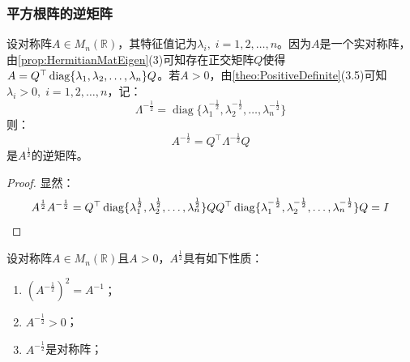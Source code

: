 \subsubsection{平方根阵的逆矩阵}
\begin{theorem}
	设对称阵$A\in M_n(\mathbb{R})$，其特征值记为$\lambda_i,\;i=1,2,\dots,n$。因为$A$是一个实对称阵，由\cref{prop:HermitianMatEigen}(3)可知存在正交矩阵$Q$使得$A=Q^{\top}\operatorname{diag}\{\lambda_1, \lambda_2, \dots, \lambda_{n}\}Q$。若$A>0$，由\cref{theo:PositiveDefinite}(3.5)可知$\lambda_i>0,\;i=1,2,\dots,n$，记：
	\begin{equation*}
		\varLambda^{-\frac{1}{2}}=\operatorname{diag}\{\lambda_1^{-\frac{1}{2}},\lambda_2^{-\frac{1}{2}},\dots,\lambda_n^{-\frac{1}{2}}\}
	\end{equation*}
	则：
	\begin{equation*}
		A^{-\frac{1}{2}}=Q^{\top}\varLambda^{-\frac{1}{2}} Q
	\end{equation*}
	是$A^{\frac{1}{2}}$的逆矩阵。
\end{theorem}
\begin{proof}
	显然：
	\begin{equation*}
		A^{\frac{1}{2}}A^{-\frac{1}{2}}=Q^{\top}\operatorname{diag}\{\lambda_1^{\frac{1}{2}},\lambda_2^{\frac{1}{2}},\dots,\lambda_n^{\frac{1}{2}}\}QQ^{\top}\operatorname{diag}\{\lambda_1^{-\frac{1}{2}},\lambda_2^{-\frac{1}{2}},\dots,\lambda_n^{-\frac{1}{2}}\}Q=I\qedhere
	\end{equation*}
\end{proof}
\begin{property}\label{prop:ReverseSquareRootMat}
	设对称阵$A\in M_n(\mathbb{R})$且$A>0$，$A^{\frac{1}{2}}$具有如下性质：
	\begin{enumerate}
		\item $(A^{-\frac{1}{2}})^2=A^{-1}$；
		\item $A^{-\frac{1}{2}}>0$；
		\item $A^{-\frac{1}{2}}$是对称阵；
	\end{enumerate}
\end{property}
